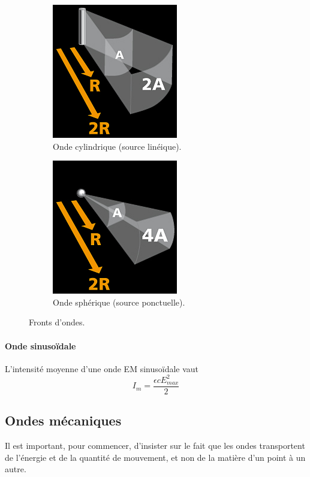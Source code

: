 \begin{figure}[ht]
	\centering
	\begin{subfigure}[b]{0.45\textwidth}
		\centering
		\includegraphics[scale=0.6]{img/cylindrical-wavefront.jpg}
		\caption{Onde cylindrique (source linéique).}
		\label{fig:onde-cyl}
	\end{subfigure}
	\begin{subfigure}[b]{0.45\textwidth}
		\centering
		\includegraphics[scale=0.6]{img/spherical-wavefront.jpg}
		\caption{Onde sphérique (source ponctuelle).}
		\label{fig:onde-sph}
	\end{subfigure}
	\caption{Fronts d'ondes.}
\end{figure}

\paragraph{Onde sinusoïdale} L'intensité moyenne d'une onde EM sinusoïdale vaut
\[I_m = \frac{\epsilon c E^2_{max}}{2}\]

\subsection{Ondes mécaniques}
Il est important, pour commencer, d'insister sur le fait
que les ondes transportent de l'énergie et de la quantité de mouvement,
et non de la matière d'un point à un autre.

